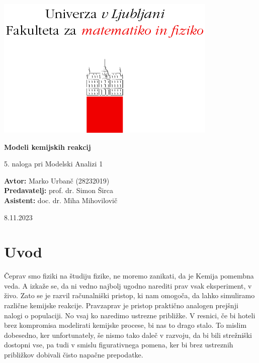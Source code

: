 \documentclass[a4paper]{article}
\begin{document}
\begin{titlepage}
    \begin{center}
        \includegraphics[]{logo.png}
        \vspace*{3cm}
        
        \Huge
        \textbf{Modeli kemijskih reakcij}
        
        \vspace{0.5cm}
        \large
        5. naloga pri Modelski Analizi 1

        \vspace{4.5cm}
        
        \textbf{Avtor:} Marko Urbanč (28232019)\ \\
        \textbf{Predavatelj:} prof. dr. Simon Širca\ \\
        \textbf{Asistent:} doc. dr. Miha Mihovilovič\ \\
        
        \vspace{2.8cm}
        
        \large
        8.11.2023
    \end{center}
\end{titlepage}
\tableofcontents
\newpage
\section{Uvod}
Čeprav smo fiziki na študiju fizike, ne moremo zanikati, da je Kemija pomembna veda. A izkaže se, da 
ni vedno najbolj ugodno narediti prav vsak eksperiment, v živo. Zato se je razvil računalniški pristop,
ki nam omogoča, da lahko simuliramo različne kemijske reakcije. Pravzaprav je pristop praktično analogen
prejšnji nalogi o populaciji. No vsaj ko naredimo ustrezne približke. V resnici, če bi hoteli brez kompromisa
modelirati kemijske procese, bi nas to drago stalo. To mislim dobesedno, ker unfortunately, še nismo tako daleč 
v razvoju, da bi bili strežniški dostopni vse, pa tudi v smislu figurativnega pomena, ker bi brez ustreznih
približkov dobivali čisto napačne prepodatke.\\
\end{document}
